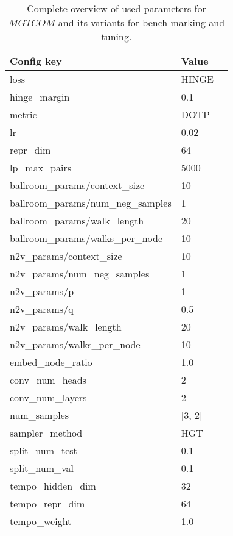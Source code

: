 \begin{table}[t!]
\centering
\caption{
    Complete overview of used parameters for $MGTCOM$ and its variants for bench marking and tuning.
} \label{tab:config}
\begin{tabular}{lll}
\toprule
                       Config key &   Value \\
\midrule
                            loss &   HINGE \\
                    hinge\_margin &     0.1 \\
                          metric &    DOTP \\
                              lr &    0.02 \\
                        repr\_dim &      64 \\
                    lp\_max\_pairs &    5000 \\
    ballroom\_params/context\_size &      10 \\
 ballroom\_params/num\_neg\_samples &       1 \\
     ballroom\_params/walk\_length &      20 \\
  ballroom\_params/walks\_per\_node &      10 \\
         n2v\_params/context\_size &      10 \\
      n2v\_params/num\_neg\_samples &       1 \\
                    n2v\_params/p &       1 \\
                    n2v\_params/q &     0.5 \\
          n2v\_params/walk\_length &      20 \\
       n2v\_params/walks\_per\_node &      10 \\
                embed\_node\_ratio &     1.0 \\
                  conv\_num\_heads &       2 \\
                 conv\_num\_layers &       2 \\
                     num\_samples &  [3, 2] \\
                  sampler\_method &     HGT \\
                  split\_num\_test &     0.1 \\
                   split\_num\_val &     0.1 \\
                tempo\_hidden\_dim &      32 \\
                  tempo\_repr\_dim &      64 \\
                    tempo\_weight &     1.0 \\

\end{tabular}
\end{table}
